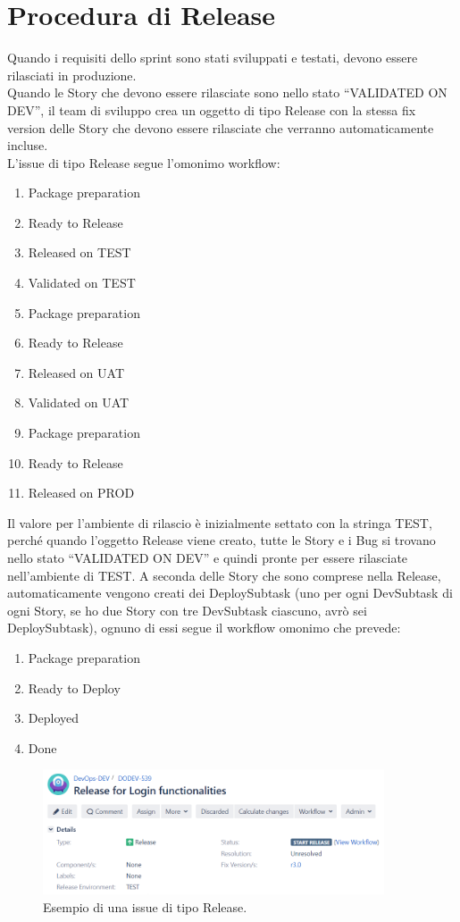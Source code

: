 \documentclass[a4paper, 12pt]{report}
\numberwithin{equation}{section}
\begin{document}
\section{Procedura di Release}
Quando i requisiti dello sprint sono stati sviluppati e testati, devono essere rilasciati in produzione. \\
Quando le Story che devono essere rilasciate sono nello stato “VALIDATED ON DEV”, il team di sviluppo crea un oggetto di tipo Release con la stessa fix version delle Story che devono essere rilasciate che verranno automaticamente incluse.\\
L’issue di tipo Release segue l’omonimo workflow:
\begin{enumerate}
    \item Package preparation
    \item Ready to Release
    \item Released on TEST
    \item Validated on TEST
    \item Package preparation
    \item Ready to Release
    \item Released on UAT
    \item Validated on UAT
    \item Package preparation
    \item Ready to Release
    \item Released on PROD
\end{enumerate}
Il valore per l’ambiente di rilascio è inizialmente settato con la stringa TEST, perché quando l’oggetto Release viene creato, tutte le Story e i Bug si trovano nello stato “VALIDATED ON DEV” e quindi pronte per essere rilasciate nell’ambiente di TEST.
A seconda delle Story che sono comprese nella Release, automaticamente vengono creati dei DeploySubtask (uno per ogni DevSubtask di ogni Story, se ho due Story con tre DevSubtask ciascuno, avrò sei DeploySubtask), ognuno di essi segue il workflow omonimo che prevede:
\begin{enumerate}
    \item Package preparation
    \item Ready to Deploy
    \item Deployed
    \item Done
\end{enumerate}
\begin{figure}[H]
    \centering
    \includegraphics[width=0.9\textwidth]{imgs/release.png}
    \caption{Esempio di una issue di tipo Release.}
    \label{fig:release}
\end{figure}
\end{document}
